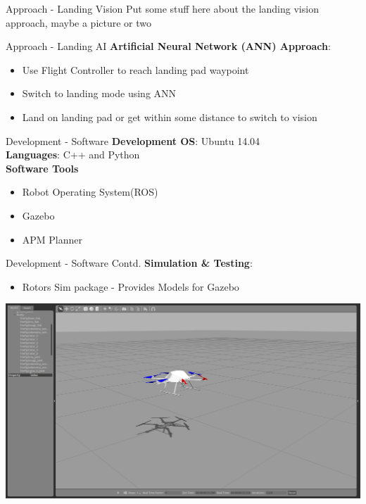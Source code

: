 \documentclass[11pt]{beamer}
\begin{document}
\begin{frame}{Approach - Landing Vision}
Put some stuff here about the landing vision approach, maybe a picture or two
\end{frame}

\begin{frame}{Approach - Landing AI}
\textbf{Artificial Neural Network (ANN) Approach}:
\begin{itemize}
\item Use Flight Controller to reach landing pad waypoint
\item Switch to landing mode using ANN
\item Land on landing pad or get within some distance to switch to vision
\end{itemize}
\end{frame}


\begin{frame}{Development - Software}
\textbf{Development OS}: Ubuntu 14.04\\
\textbf{Languages}: C++ and Python\\
\vspace{5mm}
\textbf{Software Tools}
\begin{itemize}
\item Robot Operating System(ROS)
\item Gazebo
\item APM Planner
\end{itemize}
\end{frame}


\begin{frame}{Development - Software Contd.}
\textbf{Simulation \& Testing}: 
\begin{itemize}
\item Rotors Sim package - Provides Models for Gazebo
\end{itemize}
\centerline{\includegraphics[scale=0.15]{images/Gazebo_Joy.png}}
\end{frame}
\end{document}
